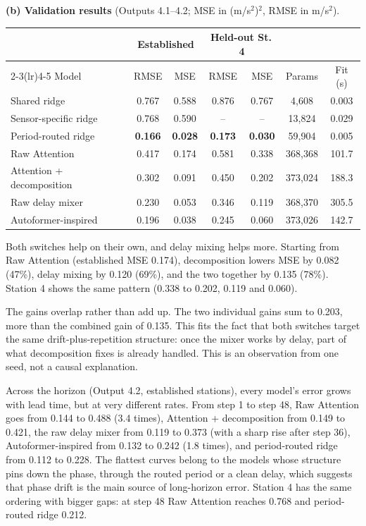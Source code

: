 \documentclass[11pt]{article}
\begin{document}
\textbf{(b) Validation results} (Outputs 4.1--4.2; MSE in (m/s$^2$)$^2$, RMSE in m/s$^2$).
\begin{center}\small
\begin{tabular}{lcccccc}\toprule
 & \multicolumn{2}{c}{Established} & \multicolumn{2}{c}{Held-out St.\,4} & & \\
 \cmidrule(lr){2-3}\cmidrule(lr){4-5}
Model & RMSE & MSE & RMSE & MSE & Params & Fit (s)\\\midrule
Shared ridge              & 0.767 & 0.588 & 0.876 & 0.767 & 4{,}608   & 0.003\\
Sensor-specific ridge     & 0.768 & 0.590 & --    & --    & 13{,}824  & 0.029\\
Period-routed ridge       & \textbf{0.166} & \textbf{0.028} & \textbf{0.173} & \textbf{0.030} & 59{,}904 & 0.005\\
Raw Attention             & 0.417 & 0.174 & 0.581 & 0.338 & 368{,}368 & 101.7\\
Attention + decomposition & 0.302 & 0.091 & 0.450 & 0.202 & 373{,}024 & 188.3\\
Raw delay mixer           & 0.230 & 0.053 & 0.346 & 0.119 & 368{,}370 & 305.5\\
Autoformer-inspired       & 0.196 & 0.038 & 0.245 & 0.060 & 373{,}026 & 142.7\\\bottomrule
\end{tabular}\end{center}

Both switches help on their own, and delay mixing helps more. Starting from Raw Attention
(established MSE 0.174), decomposition lowers MSE by 0.082 (47\%), delay mixing by 0.120 (69\%), and
the two together by 0.135 (78\%). Station 4 shows the same pattern (0.338 to 0.202, 0.119 and
0.060).

The gains overlap rather than add up. The two individual gains sum to 0.203, more than the combined
gain of 0.135. This fits the fact that both switches target the same drift-plus-repetition
structure: once the mixer works by delay, part of what decomposition fixes is already handled.
This is an observation from one seed, not a causal explanation.

Across the horizon (Output 4.2, established stations), every model's error grows with lead time,
but at very different rates. From step 1 to step 48, Raw Attention goes from 0.144 to 0.488 (3.4
times), Attention + decomposition from 0.149 to 0.421, the raw delay mixer from 0.119 to 0.373
(with a sharp rise after step 36), Autoformer-inspired from 0.132 to 0.242 (1.8 times), and
period-routed ridge from 0.112 to 0.228. The flattest curves belong to the models whose structure
pins down the phase, through the routed period or a clean delay, which suggests that phase drift
is the main source of long-horizon error. Station 4 has the same ordering with bigger gaps: at step
48 Raw Attention reaches 0.768 and period-routed ridge 0.212.
\end{document}
